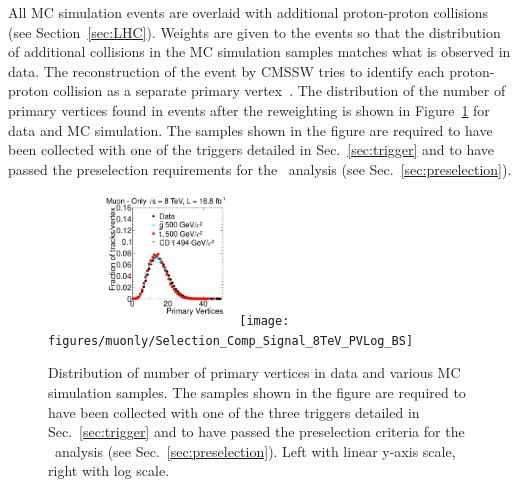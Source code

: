 All MC simulation events are overlaid with additional proton-proton collisions (see Section~\ref{sec:LHC}).
Weights are given to the events so that the distribution of additional collisions in the MC simulation samples matches what is observed in data.
The reconstruction of the event by CMSSW tries to identify each proton-proton collision as a separate primary vertex~\cite{2010EPJC...70.1165K}.
The distribution of the number of primary vertices found in events after the reweighting is shown in Figure~\ref{fig:PV} for data and MC simulation.
The samples shown in the figure are required to have been collected with one of the triggers detailed in Sec.~\ref{sec:trigger} and to have
passed the preselection requirements for the \muononly\ analysis (see Sec.~\ref{sec:preselection}).

\begin{figure}
  \begin{center}
      \includegraphics[clip=false, trim=0.0cm 0cm 0.0cm 0cm, width=0.44\textwidth]{figures/muonly/Selection_Comp_Signal_8TeV_PV_BS}
      \texttt{[image: figures/muonly/Selection\_Comp\_Signal\_8TeV\_PVLog\_BS]} \\
  \end{center}
        \caption[Distribution of number of primary vertices in data and various MC simulation samples]
{Distribution of number of primary vertices in data and various MC simulation samples. 
The samples shown in the figure are required to have been collected with one of the three triggers detailed in Sec.~\ref{sec:trigger}
and to have passed the preselection criteria for the \muononly\ analysis (see Sec.~\ref{sec:preselection}).
Left with linear y-axis scale, right with log scale.
        }
      \label{fig:PV}
\end{figure}